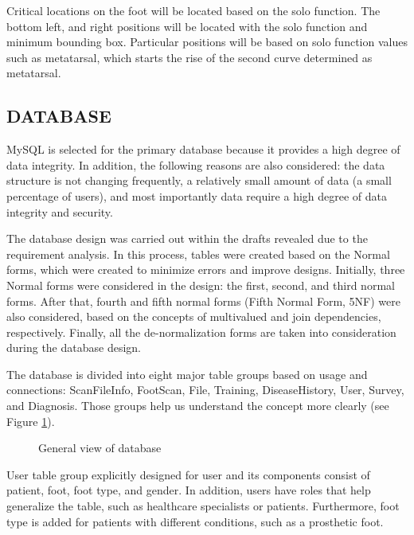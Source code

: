 Critical locations on the foot will be located based on the solo function. The bottom left, and right positions will be located with the solo function and minimum bounding box. Particular positions will be based on solo function values such as metatarsal, which starts the rise of the second curve determined as metatarsal.

\subsection{DATABASE} \label{sec:StudyIDatabase}

MySQL is selected for the primary database because it provides a high degree of data integrity. In addition, the following reasons are also considered: the data structure is not changing frequently, a relatively small amount of data (a small percentage of users), and most importantly data require a high degree of data integrity and security.

The database design was carried out within the drafts revealed due to the requirement analysis. In this process, tables were created based on the Normal forms, which were created to minimize errors and improve designs. Initially, three Normal forms were considered in the design: the first, second, and third normal forms. After that, fourth and fifth normal forms (Fifth Normal Form, 5NF) were also considered, based on the concepts of multivalued and join dependencies, respectively. Finally, all the de-normalization forms are taken into consideration during the database design.

The database is divided into eight major table groups based on usage and connections: ScanFileInfo, FootScan, File, Training, DiseaseHistory, User, Survey, and Diagnosis. Those groups help us understand the concept more clearly (see Figure \ref{fig:DatabaseGeneralView}). 

\begin{figure}[htbp]
\centering
{}
\caption{General view of database}
\label{fig:DatabaseGeneralView}
\end{figure}

User table group explicitly designed for user and its components consist of patient, foot, foot type, and gender. In addition, users have roles that help generalize the table, such as healthcare specialists or patients. Furthermore,  foot type is added for patients with different conditions, such as a prosthetic foot. 

